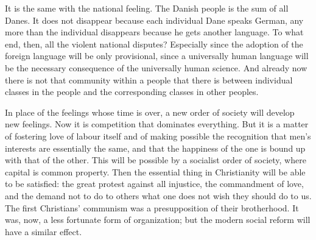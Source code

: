 \documentclass[12pt,a4paper]{book}
\begin{document}
It is the same with the national feeling. The Danish people is the sum of all Danes. It does
not disappear because each individual Dane speaks German, any more than the individual
disappears because he gets another language. To what end, then, all the violent national
disputes? Especially since the adoption of the foreign language will be only provisional,
since a universally human language will be the necessary consequence of the universally human
science. And already now there is not that community within a people that there is between
individual classes in the people and the corresponding classes in other peoples.

In place of the feelings whose time is over, a new order of society will develop new feelings.
Now it is competition that dominates everything. But it is a matter of fostering love of labour
itself and of making possible the recognition that men's interests are essentially the same,
and that the happiness of the one is bound up with that of the other. This will be possible by
a socialist order of society, where capital is common property. Then the essential thing in
Christianity will be able to be satisfied: the great protest against all injustice, the
commandment of love, and the demand not to do to others what one does not wish they should do
to us. The first Christians' communism was a presupposition of their brotherhood. It was, now,
a less fortunate form of organization; but the modern social reform will have a similar effect.
\end{document}
